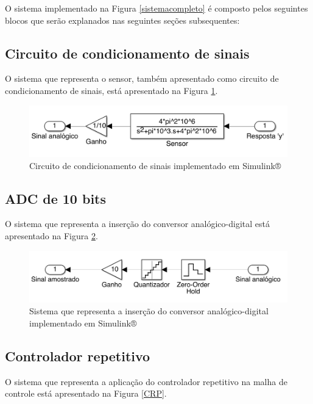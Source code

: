	 O sistema implementado na Figura \ref{sistemacompleto} é composto pelos seguintes blocos que serão explanados nas seguintes seções subsequentes:
	 
	 \subsection{Circuito de condicionamento de sinais}
	 
	 O sistema que representa o sensor, também apresentado como circuito de condicionamento de sinais, está apresentado na Figura \ref{CCS}.
	 
	 \begin{figure}[hbt]
		\centering
  		\includegraphics[scale=.4]{Imagens/Relatorio6/Sensor}
  		\caption{Circuito de condicionamento de sinais implementado em Simulink®}
  		\label{CCS}
		\end{figure}
		
		\subsection{ADC de 10 bits}
	 
	 O sistema que representa a inserção do conversor analógico-digital está apresentado na Figura \ref{ADC}.
	 
	 \begin{figure}[hbt]
		\centering
  		\includegraphics[scale=.4]{Imagens/Relatorio6/ADC}
  		\caption{Sistema que representa a inserção do conversor analógico-digital implementado em Simulink®}
  		\label{ADC}
		\end{figure}
		
		\subsection{Controlador repetitivo}
	 
	 O sistema que representa a aplicação do controlador repetitivo na malha de controle está apresentado na Figura \ref{CRP}.
	 
